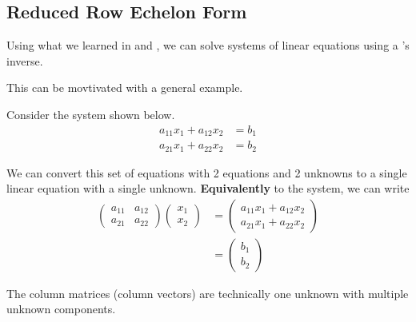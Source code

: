 \subsection{Reduced Row Echelon Form}\label{subsec:RREF}
Using what we learned in  and , we can solve systems of linear equations using a 's inverse.

This can be movtivated with a general example.
\begin{blackbox}
  Consider the system shown below.
  \begin{align*}
    a_{11} x_{1} + a_{12} x_{2} &= b_{1} \\
    a_{21} x_{1} + a_{22} x_{2} &= b_{2}
  \end{align*}

  We can convert this set of equations with 2 equations and 2 unknowns to a single linear equation with a single unknown.
  \textbf{Equivalently} to the system, we can write
  \begin{align*}
    \begin{pmatrix}
      a_{11} & a_{12} \\
      a_{21} & a_{22}
    \end{pmatrix}
    \begin{pmatrix}
      x_{1} \\
      x_{2}
    \end{pmatrix} &=
    \begin{pmatrix}
      a_{11} x_{1} + a_{12} x_{2} \\
      a_{21} x_{1} + a_{22} x_{2}
    \end{pmatrix} \\
    &=
      \begin{pmatrix}
        b_{1} \\
        b_{2}
      \end{pmatrix}
  \end{align*}

  The column matrices (column vectors) are technically one unknown with multiple unknown components.


\end{blackbox}
